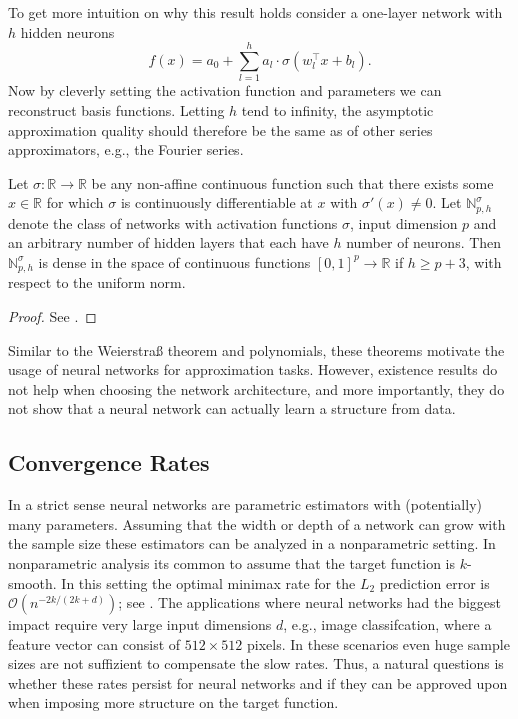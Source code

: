 To get more intuition on why this result holds consider a one-layer network with $h$
hidden neurons
\[
    f(x) = a_0 + \sum_{l = 1}^h a_l \cdot \sigma(w_l^\top x + b_l).
\]
Now by cleverly setting the activation function and parameters we can reconstruct basis
functions. Letting $h$ tend to infinity, the asymptotic approximation quality should
therefore be the same as of other series approximators, e.g., the Fourier series.

\begin{theorem}
    Let $\sigma : \mathbb{R} \to \mathbb{R}$ be any non-affine continuous function such
    that there exists some $x \in \mathbb{R}$ for which $\sigma$ is continuously
    differentiable at $x$ with $\sigma'(x) \neq 0$. Let $\mathbb{N}_{p, h}^\sigma$
    denote the class of networks with activation functions $\sigma$, input dimension
    $p$ and an arbitrary number of hidden layers that each have $h$ number of neurons.
    Then $\mathbb{N}_{p,h}^\sigma$ is dense in the space of continuous functions
    $[0, 1]^p \to \mathbb{R}$ if $h \geq p + 3$, with respect to the uniform norm.
\end{theorem}
\begin{proof}
    See \cite{Kidger.2020}.
\end{proof}

Similar to the Weierstra{\ss} theorem and polynomials, these theorems motivate the usage
of neural networks for approximation tasks. However, existence results do not help when
choosing the network architecture, and more importantly, they do not show that a neural
network can actually learn a structure from data.

\subsection{Convergence Rates}

In a strict sense neural networks are parametric estimators with (potentially) many
parameters. Assuming that the width or depth of a network can grow with the sample size
these estimators can be analyzed in a nonparametric setting. In nonparametric analysis
its common to assume that the target function is $k$-smooth. In this setting the optimal
minimax rate for the $L_2$ prediction error is $\mathcal{O}(n^{-2k/(2k+d)})$; see
\cite{Stone.1982}. The applications where neural networks had the biggest impact require
very large input dimensions $d$, e.g., image classifcation, where a feature vector can
consist of $512 \times 512$ pixels. In these scenarios even huge sample sizes are not
suffizient to compensate the slow rates. Thus, a natural questions is whether these
rates persist for neural networks and if they can be approved upon when imposing more
structure on the target function.

